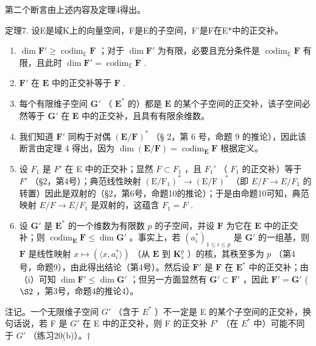 第二个断言由上述内容及定理4得出。

定理7. 设E是域K上的向量空间，F是E的子空间，F'是F在E*中的正交补。

\begin{enumerate}
\def\labelenumi{(\roman{enumi})}
\item
  \(\dim \mathbf{F}' \geqslant \operatorname{codim}_{\mathbb{E}} \mathbf{F}\) ；对于 \(\dim \mathbf{F}'\) 为有限，必要且充分条件是 \(\operatorname{codim}_{\mathbb{E}} \mathbf{F}\) 有限，且此时 \(\dim \mathbf{F}' = \operatorname{codim}_{\mathbb{E}} \mathbf{F}\) .
\item
  \(\mathbf{F}'\) 在 \(\mathbf{E}\) 中的正交补等于 \(\mathbf{F}\) .
\item
  每个有限维子空间 \(\mathbf{G}'\) （ \(\mathbf{E}^*\) 的）都是 \(\mathbf{E}\) 的某个子空间的正交补，该子空间必然等于 \(\mathbf{G}'\) 在 \(\mathbf{E}\) 中的正交补，且具有有限余维数。
\item
  我们知道 \(\mathbf{F}'\) 同构于对偶 \((\mathbf{E} / \mathbf{F})^*\) （§ 2，第 6 号，命题 9 的推论），因此该断言由定理 4 得出，因为 \(\dim (\mathbf{E} / \mathbf{F}) = \operatorname{codim}_{\mathbf{E}}\mathbf{F}\) 根据定义。
\item
  设 \(F_{1}\) 是 \(F'\) 在 E 中的正交补；显然 \(F \subset F_{1}\) ，且 \(F_{1}'\) （ \(F_{1}\) 的正交补）等于 \(F'\) （§2，第4号）；典范线性映射 \((\mathrm{E}/\mathrm{F}_{1})^{*} \to (\mathrm{E}/\mathrm{F})^{*}\) （即 \(E/F \to E/F_{1}\) 的转置）因此是双射的（§2，第6号，命题10的推论）；于是由命题10可知，典范映射 \(E/F \to E/F_{1}\) 是双射的，这蕴含 \(F_{1} = F\) .
\item
  设 \(\mathbf{G}'\) 是 \(\mathbf{E}^*\) 的一个维数为有限数 \(p\) 的子空间，并设 \(\mathbf{F}\) 为它在 \(\mathbf{E}\) 中的正交补；则 \(\operatorname{codim}_{\mathbf{E}} \mathbf{F} \leqslant \dim \mathbf{G}'\) 。事实上，若 \((a_{i}^{*})_{1 \leqslant i \leqslant p}\) 是 \(\mathbf{G}'\) 的一组基，则 \(\mathbf{F}\) 是线性映射 \(x \mapsto (\langle x, a_{i}^{*} \rangle)\) （从 \(\mathbf{E}\) 到 \(\mathbf{K}_{s}^{p}\) ）的核，其秩至多为 \(p\) （第4号，命题9），由此得出结论（第4号）。然后设 \(\mathbf{F}'\) 是 \(\mathbf{F}\) 在 \(\mathbf{E}^*\) 中的正交补；由（i）可知 \(\dim \mathbf{F}' \leqslant \dim \mathbf{G}'\) ；但另一方面显然有 \(\mathbf{G}' \subset \mathbf{F}'\) ，因此 \(\mathbf{F}' = \mathbf{G}'\) ( \(\S 2\) ，第3号，命题4的推论4）。
\end{enumerate}

注记。一个无限维子空间 \(G'\) （含于 \(E^{*}\) ）不一定是 E 的某个子空间的正交补，换句话说，若 F 是 \(G'\) 在 E 中的正交补，则 F 的正交补 \(F'\) （在 \(E^{*}\) 中）可能不同于 \(G'\) （练习20(b)）。†

